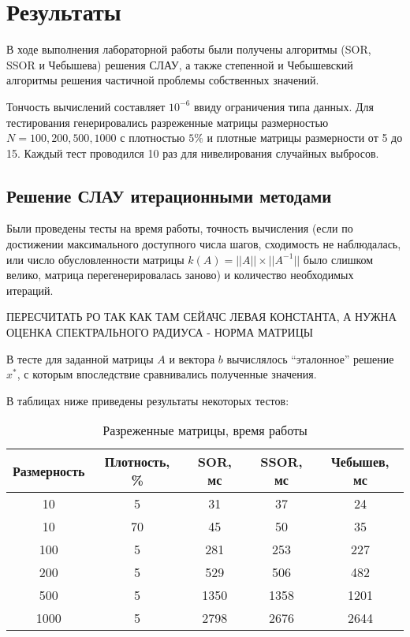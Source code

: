 \documentclass[12pt]{article}
\begin{document}
    \clearpage


\newpage
    {
        \section{Результаты}
    }
    
    
    
    В ходе выполнения лабораторной работы были получены алгоритмы (SOR, SSOR и Чебышева) решения СЛАУ, а также степенной и Чебышевский алгоритмы решения частичной проблемы собственных значений.
    
    Тончость вычислений составляет $10^{-6}$ ввиду ограничения типа данных. Для тестирования генерировались разреженные матрицы размерностью $N=100, 200, 500, 1000$ с плотностью $5\%$ и плотные матрицы размерности от 5 до 15. Каждый тест проводился 10 раз для нивелирования случайных выбросов.
    
    \bigskip
    {
    	\subsection{Решение СЛАУ итерационными методами}
    }
    
    Были проведены тесты на время работы, точность вычисления (если по достижении максимального доступного числа шагов, сходимость не наблюдалась, или число обусловленности матрицы $k(A) = ||A|| \times ||A^{-1}||$ было слишком велико, матрица перегенерировалась заново) и количество необходимых итераций. 
    
    \bigskip
    ПЕРЕСЧИТАТЬ РО ТАК КАК ТАМ СЕЙАЧС ЛЕВАЯ КОНСТАНТА, А НУЖНА ОЦЕНКА СПЕКТРАЛЬНОГО РАДИУСА - НОРМА МАТРИЦЫ
    
    \bigskip
    
	В тесте для заданной матрицы $A$  и вектора $b$ вычислялось ``эталонное'' решение $x^{*}$, с которым впоследствие сравнивались полученные значения.
    
    В таблицах ниже приведены результаты некоторых тестов:
    
    \begin{table}[h!]
    \caption{Разреженные матрицы, время работы}
\begin{center}
 \begin{tabular}{|c|c|c|c|c|} 
 \hline
 Размерность & Плотность, \% & SOR, мс & SSOR, мс & Чебышев, мс \\
\hline
10 & 5& 31 & 37 & 24 \\
\hline
10 & 70& 45 & 50 & 35 \\
\hline
100 & 5 & 281 & 253 & 227 \\
\hline
200 & 5 & 529 & 506 & 482 \\
\hline
500 & 5 & 1350 & 1358 & 1201 \\
\hline
1000 & 5 & 2798 & 2676 & 2644 \\
\hline
\end{tabular}
\end{center}
    \end{table}
    
\end{document}
